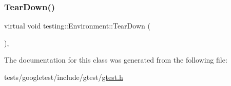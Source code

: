 \mbox{\label{classtesting_1_1Environment_a039bdaa705c46b9b88234cf4d3bb6254}} 
\subsubsection{\texorpdfstring{Tear\+Down()}{TearDown()}}
{\footnotesize\ttfamily virtual void testing\+::\+Environment\+::\+Tear\+Down (\begin{DoxyParamCaption}{ }\end{DoxyParamCaption})\hspace{0.3cm}{\ttfamily [inline]}, {\ttfamily [virtual]}}



The documentation for this class was generated from the following file\+:\begin{DoxyCompactItemize}
\item 
tests/googletest/include/gtest/\hyperlink{gtest_8h}{gtest.\+h}\end{DoxyCompactItemize}
